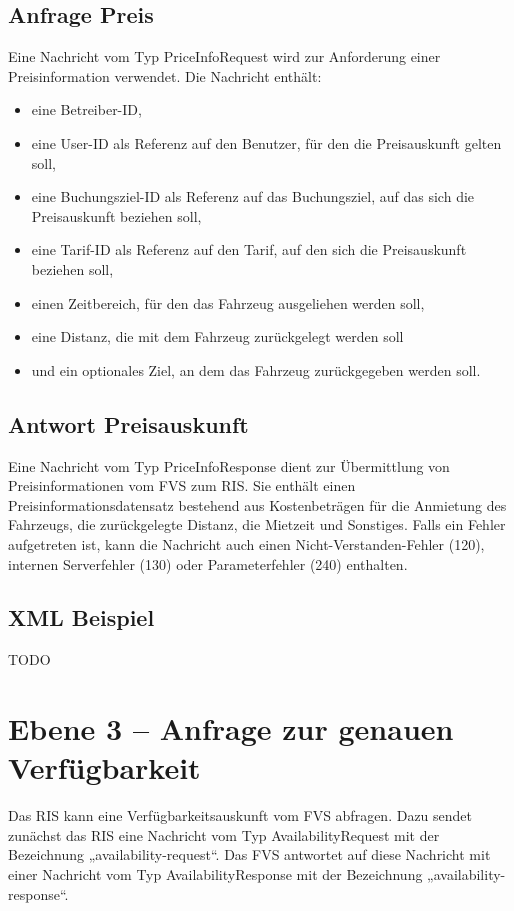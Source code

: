 

\subsection{Anfrage Preis}
Eine Nachricht vom Typ PriceInfoRequest wird zur Anforderung einer Preisinformation verwendet. Die Nachricht enthält:
\begin{itemize}
\item eine Betreiber-ID,
\item eine User-ID als Referenz auf den Benutzer, für den die Preisauskunft gelten soll,
\item eine Buchungsziel-ID als Referenz auf das Buchungsziel, auf das sich die Preisauskunft beziehen soll,
\item eine Tarif-ID als Referenz auf den Tarif, auf den sich die Preisauskunft beziehen soll,
\item einen Zeitbereich, für den das Fahrzeug ausgeliehen werden soll,
\item eine Distanz, die mit dem Fahrzeug zurückgelegt werden soll
\item und ein optionales Ziel, an dem das Fahrzeug zurückgegeben werden soll.
\end{itemize}



\subsection{Antwort Preisauskunft}
Eine Nachricht vom Typ PriceInfoResponse dient zur Übermittlung von Preisinformationen vom FVS zum RIS. Sie enthält einen Preisinformationsdatensatz bestehend aus Kostenbeträgen für die Anmietung des Fahrzeugs, die zurückgelegte Distanz, die Mietzeit und Sonstiges. Falls ein Fehler aufgetreten ist, kann die Nachricht auch einen Nicht-Verstanden-Fehler (120), internen Serverfehler (130) oder Parameterfehler (240) enthalten.



\subsection{XML Beispiel}
TODO

\section{Ebene 3 -- Anfrage zur genauen Verfügbarkeit}
Das RIS kann eine Verfügbarkeitsauskunft vom FVS abfragen. Dazu sendet zunächst das RIS eine Nachricht vom Typ AvailabilityRequest mit der Bezeichnung „availability-request“. Das FVS antwortet auf diese Nachricht mit einer Nachricht vom Typ AvailabilityResponse mit der Bezeichnung „availability-response“.

